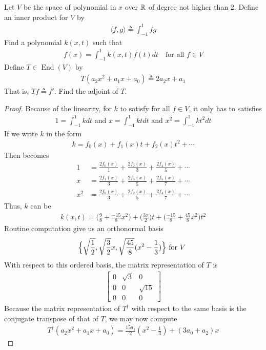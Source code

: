 \documentclass{report}
\begin{document}
\begin{question}{}{}
Let $V$ be the space of polynomial in $x$ over  $\mathbb{R}$ of degree not higher than  $2$. Define an inner product for $V$ by 
\begin{align*}
\langle f,g\rangle \triangleq \int_{-1}^{1} fg
\end{align*}
Find a polynomial $k(x,t)$ such that 
\begin{align}
\label{fx=}
f(x)= \int_{-1}^{1}k(x,t)f(t)dt \quad\text{for all }f \in V
\end{align}
Define $T \in \operatorname{End}(V)$ by 
\begin{align*}
T(a_2x^2+a_1x+a_0) \triangleq 2a_2x+a_1
\end{align*}
That is, $Tf\triangleq f'$. Find the adjoint of $T$. 
\end{question}
\begin{proof}
Because of the linearity, for $k$ to satisfy  for all $f\in V$, it only has to satisfies 
\begin{align}
\label{solve}
1=\int_{-1}^{1}kdt\text{ and }x=\int_{-1}^{1}ktdt \text{ and }x^2 =\int_{-1}^{1}kt^2dt
\end{align}
If we write $k$ in the form 
\begin{align*}
k= f_0(x)+ f_1(x)t+ f_2(x)t^2 + \cdots 
\end{align*}
Then  becomes 
\begin{align*}
1&= \frac{2f_0(x)}{1}+ \frac{2f_2(x)}{3}+ \frac{2f_4(x)}{5}+ \cdots  \\
x&=  \frac{2f_1(x)}{3}+ \frac{2f_3(x)}{5}+ \frac{2f_5(x)}{7}+ \cdots \\
x^2&= \frac{2f_0(x)}{3} + \frac{2f_2(x)}{5}+ \frac{2f_4(x)}{7}+ \cdots 
\end{align*}
Thus, $k$ can be 
\begin{align*}
k(x,t)= \Big(\frac{9}{8}+ \frac{-15}{8}x^2\Big)+ \Big(\frac{3x}{2}\Big)t+ \Big(\frac{-15}{8}+ \frac{45}{8}x^2\Big)t^2 
\end{align*}
Routine computation give us an orthonormal basis 
\begin{align*}
\Big\{ \sqrt{\frac{1}{2}}, \sqrt{\frac{3}{2}}x, \sqrt{\frac{45}{8}}(x^2- \frac{1}{3}) \Big\}\text{ for $V$ }
\end{align*}
With respect to this ordered basis, the matrix representation of $T$ is 
\begin{align*}
\begin{bmatrix}
  0 & \sqrt{3}  & 0 \\
  0 & 0 & \sqrt{15} \\
  0 & 0 & 0 
\end{bmatrix}
\end{align*}
Because the matrix representation of $T^\dagger $ with respect to the same basis is the conjugate transpose of that of  $T$, we may now compute 
 \begin{align*}
T^\dagger (a_2x^2+a_1x+a_0)= \frac{15a_1}{2}(x^2- \frac{1}{3})+ (3a_0+a_2)x
\end{align*}
\end{proof}
\end{document}
